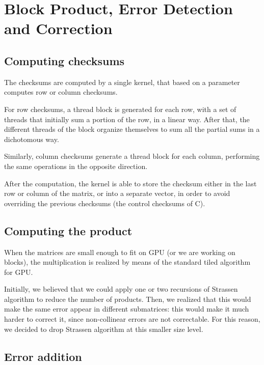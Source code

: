 \section{Block Product, Error Detection and Correction}
\label{sec:block}

\subsection{Computing checksums}

The checksums are computed by a single kernel, that based on a parameter computes row or column checksums.

For row checksums, a thread block is generated for each row, with a set of threads that initially sum a portion of the row, in a linear way.
After that, the different threads of the block organize themselves to sum all the partial sums in a dichotomous way.

Similarly, column checksums generate a thread block for each column, performing the same operations in the opposite direction.

After the computation, the kernel is able to store the checksum either in the last row or column of the matrix, or into a separate vector, in order to avoid overriding the previous checksums (the control checksums of C).


\subsection{Computing the product}

When the matrices are small enough to fit on GPU (or we are working on blocks), the multiplication is realized by means of the standard tiled algorithm for GPU.

Initially, we believed that we could apply one or two recursions of Strassen algorithm to reduce the number of products.
Then, we realized that this would make the same error appear in different submatrices: this would make it much harder to correct it, since non-collinear errors are not correctable.
For this reason, we decided to drop Strassen algorithm at this smaller size level.


\subsection{Error addition}

